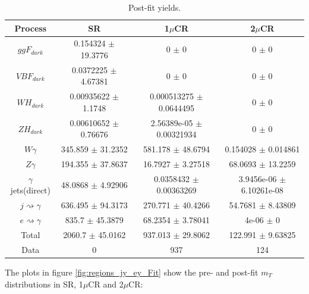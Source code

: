 \begin{table}[h!]
    \centering
    \begin{tabular}{|c|c|c|c|}
    \hline
       \textbf{Process}  & \textbf{SR} & \textbf{1$\mu$CR} & \textbf{2$\mu$CR} \\
    \hline
    $ggF_{dark}$ & 0.154324 $\pm$ 19.3776& 0 $\pm$ 0 & 0 $\pm$ 0\\
    \hline
     $VBF_{dark}$  & 0.0372225 $\pm$ 4.67381 & 0 $\pm$ 0 & 0 $\pm$ 0 \\
    \hline
      $WH_{dark}$ & 0.00935622 $\pm$ 1.1748 & 0.000513275 $\pm$ 0.0644495  & 0 $\pm$ 0 \\
    \hline
      $ZH_{dark}$ & 0.00610652 $\pm$ 0.76676 &  2.56389e-05 $\pm$ 0.00321934 & 0 $\pm$ 0 \\
    \hline
      $W\gamma$ & 345.859 $\pm$ 31.2352& 581.178 $\pm$ 48.6794& 0.154028 $\pm$ 0.014861\\
    \hline
      $Z\gamma$ & 194.355 $\pm$ 37.8637 & 16.7927 $\pm$ 3.27518 & 68.0693 $\pm$ 13.2259\\
    \hline
      $\gamma$jets(direct) & 48.0868 $\pm$ 4.92906 & 0.0358432 $\pm$ 0.00363269 & 3.9456e-06 $\pm$ 6.10261e-08\\
    \hline
     $j \rightsquigarrow \gamma$  & 636.495 $\pm$ 94.3173 & 270.771 $\pm$ 40.4266 & 54.7681 $\pm$ 8.43809\\
    \hline
     $e \rightsquigarrow \gamma$  & 835.7 $\pm$ 45.3879 & 68.2354 $\pm$ 3.78041 & 4e-06 $\pm$ 0 \\
    \hline
     Total  &2060.7 $\pm$ 45.0162 & 937.013 $\pm$ 29.8062 & 122.991 $\pm$ 9.63825\\
    \hline
     Data  & 0 & 937& 124\\
    \hline
    
    \end{tabular}
    \caption{Post-fit yields.}
    \label{tab:yields_post}
\end{table}

\noindent
The plots in figure \ref{fig:regions_jy_ey_Fit} show the pre- and post-fit $m_T$ distributions in SR, 1$\mu$CR and 2$\mu$CR:\\

